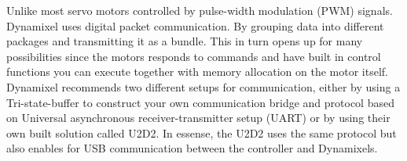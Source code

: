 Unlike most servo motors controlled by pulse-width modulation (PWM) signals.
Dynamixel uses digital packet communication.
By grouping data into different packages and transmitting it as a bundle.
This in turn opens up for many possibilities since the motors responds to commands and have built in control functions you can execute together with memory allocation on the motor itself.
Dynamixel recommends two different setups for communication,
either by using a Tri-state-buffer to construct your own communication bridge and protocol based on Universal asynchronous receiver-transmitter setup (UART) or by using their own built solution called U2D2.
In essense, the U2D2 uses the same protocol but also enables for USB communication between the controller and Dynamixels. 
